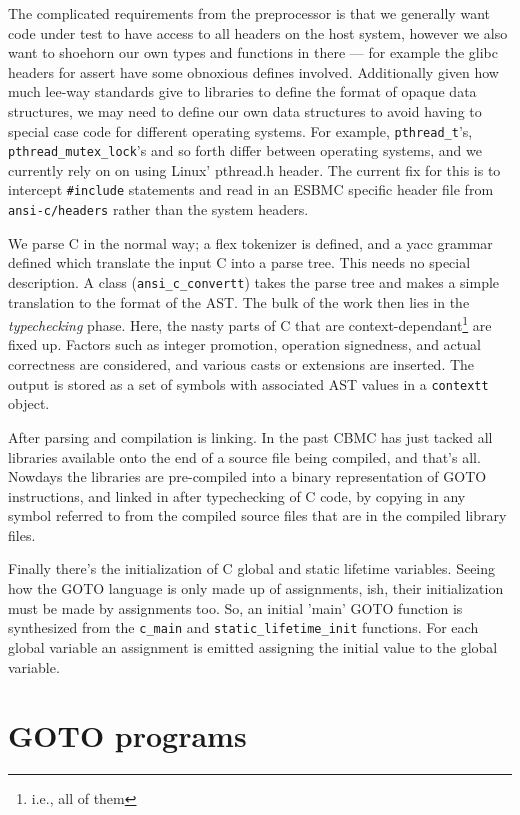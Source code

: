 \documentclass{article}
\begin{document}
The complicated requirements from the preprocessor is that we generally want
code under test to have access to all headers on the host system, however we
also want to shoehorn our own types and functions in there --- for example the
glibc headers for assert have some obnoxious defines involved. Additionally
given how much lee-way standards give to libraries to define the format of
opaque data structures, we may need to define our own data structures to
avoid having to special case code for different operating systems. For example,
\texttt{pthread\_t}'s, \texttt{pthread\_mutex\_lock}'s and so forth differ
between operating systems, and we currently rely on on using Linux' pthread.h
header. The current fix for this is to intercept \texttt{\#include} statements
and read in an ESBMC specific header file from \texttt{ansi-c/headers} rather
than the system headers.

We parse C in the normal way; a flex tokenizer is defined, and a yacc grammar
defined which translate the input C into a parse tree. This needs no special
description. A class (\texttt{ansi\_c\_convertt}) takes the parse tree and
makes a simple translation to the format of the AST. The bulk of the work then
lies in the \textit{typechecking} phase. Here, the nasty parts of C that are
context-dependant\footnote{i.e., all of them} are fixed up. Factors such as
integer promotion, operation signedness, and actual correctness are
considered, and various casts or extensions are inserted. The output is stored
as a set of symbols with associated AST values in a \texttt{contextt} object.

After parsing and compilation is linking. In the past CBMC has just
tacked all libraries available onto the end of a source file being compiled,
and that's all. Nowdays the libraries are pre-compiled into a binary
representation of GOTO instructions, and linked in after typechecking of C
code, by copying in any symbol referred to from the compiled source files
that are in the compiled library files.

Finally there's the initialization of C global and static lifetime variables.
Seeing how the GOTO language is only made up of assignments, ish, their
initialization must be made by assignments too. So, an initial 'main' GOTO
function is synthesized from the \texttt{c\_main} and
\texttt{static\_lifetime\_init} functions. For each global variable an
assignment is emitted assigning the initial value to the global variable.

\section{GOTO programs}
\end{document}
